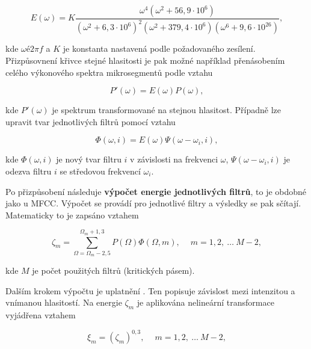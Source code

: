 \begin{equation}
  E\left(\omega\right) = K \frac{\omega^4\left(\omega^2 + 56,9 \cdot 10^6\right)}{\left(\omega^2 + 6,3 \cdot 10^6\right)^2\left(\omega^2 + 379,4 \cdot 10^6\right)\left(\omega^6 + 9,6 \cdot 10^{26}\right)},
  \label{eq:asr:plp:filter}
\end{equation}

\noindent kde $\omega é 2\pi f$ a $K$ je konstanta nastavená podle požadovaného zesílení. Přizpůsovnení křivce stejné hlasitosti je pak možné například přenásobením celého výkonového spektra mikrosegmentů podle vztahu

\begin{equation}
  P'\left(\omega\right) = E\left(\omega\right)P\left(\omega\right),
  \label{eq:asr:plp:filter:application1}
\end{equation}

\noindent kde $P'\left(\omega\right)$ je spektrum transformované na stejnou hlasitost. Případně lze upravit tvar jednotlivých filtrů pomocí vztahu

\begin{equation}
  \Phi\left(\omega, i\right) = E\left(\omega\right)\Psi\left(\omega - \omega_i, i\right),
  \label{eq:asr:plp:filter:application2}
\end{equation}

\noindent kde $\Phi\left(\omega, i\right)$ je nový tvar filtru $i$ v závislosti na frekvenci $\omega$, $\Psi\left(\omega - \omega_i, i\right)$ je odezva filtru $i$ se středovou frekvencí $\omega_i$.

Po přizpůsobení následuje \textbf{výpočet energie jednotlivých filtrů}, to je obdobné jako u MFCC. Výpočet se provádí pro jednotlivé filtry a výsledky se pak sčítají. Matematicky to je zapsáno vztahem

\begin{equation}
  \zeta_m = \sum_{\Omega = \Omega_m - 2,5}^{\Omega_m + 1,3} P\left(\Omega\right)\Phi\left(\Omega, m\right), \quad\ m=1, 2,\ \dots\ M - 2,
  \label{eq:asr:plp:energy}
\end{equation}

\noindent kde $M$ je počet použitých filtrů (kritických pásem).

Dalším krokem výpočtu je uplatnění \textbf{}. Ten popisuje závislost mezi intenzitou a vnímanou hlasitostí. Na energie $\zeta_m$ je aplikována nelineární transformace vyjádřena vztahem

\begin{equation}
  \xi_m = \left(\zeta_m\right)^{0,3}, \quad\ m = 1, 2,\ \dots\ M-2,
  \label{eq:asr:plp:energy:transform}
\end{equation}

